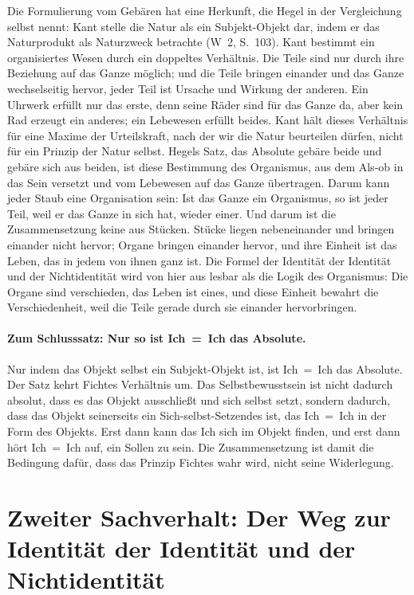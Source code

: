 \documentclass[11pt,a4paper]{article}
\newcommand{\SO}{Subjekt-Objekt}
\newcommand{\Werke}[1]{(W~2, S.~#1)}
\begin{document}
Die Formulierung vom Gebären hat eine Herkunft, die Hegel in der Vergleichung selbst nennt: Kant stelle die Natur als ein \SO{} dar, indem er das Naturprodukt als Naturzweck betrachte \Werke{103}. Kant bestimmt ein organisiertes Wesen durch ein doppeltes Verhältnis. Die Teile sind nur durch ihre Beziehung auf das Ganze möglich; und die Teile bringen einander und das Ganze wechselseitig hervor, jeder Teil ist Ursache und Wirkung der anderen. Ein Uhrwerk erfüllt nur das erste, denn seine Räder sind für das Ganze da, aber kein Rad erzeugt ein anderes; ein Lebewesen erfüllt beides. Kant hält dieses Verhältnis für eine Maxime der Urteilskraft, nach der wir die Natur beurteilen dürfen, nicht für ein Prinzip der Natur selbst. Hegels Satz, das Absolute gebäre beide und gebäre sich aus beiden, ist diese Bestimmung des Organismus, aus dem Als-ob in das Sein versetzt und vom Lebewesen auf das Ganze übertragen. Darum kann jeder Staub eine Organisation sein: Ist das Ganze ein Organismus, so ist jeder Teil, weil er das Ganze in sich hat, wieder einer. Und darum ist die Zusammensetzung keine aus Stücken. Stücke liegen nebeneinander und bringen einander nicht hervor; Organe bringen einander hervor, und ihre Einheit ist das Leben, das in jedem von ihnen ganz ist. Die Formel der Identität der Identität und der Nichtidentität wird von hier aus lesbar als die Logik des Organismus: Die Organe sind verschieden, das Leben ist eines, und diese Einheit bewahrt die Verschiedenheit, weil die Teile gerade durch sie einander hervorbringen.

\paragraph{Zum Schlusssatz: Nur so ist Ich~=~Ich das Absolute.}
\glqq Nur indem das Objekt selbst ein \SO{} ist, ist Ich~=~Ich das Absolute.\grqq{} Der Satz kehrt Fichtes Verhältnis um. Das Selbstbewusstsein ist nicht dadurch absolut, dass es das Objekt ausschließt und sich selbst setzt, sondern dadurch, dass das Objekt seinerseits ein Sich-selbst-Setzendes ist, das Ich~=~Ich in der Form des Objekts. Erst dann kann das Ich sich im Objekt finden, und erst dann hört Ich~=~Ich auf, ein Sollen zu sein. Die Zusammensetzung ist damit die Bedingung dafür, dass das Prinzip Fichtes wahr wird, nicht seine Widerlegung.

\section{Zweiter Sachverhalt: Der Weg zur Identität der Identität und der Nichtidentität}
\end{document}
